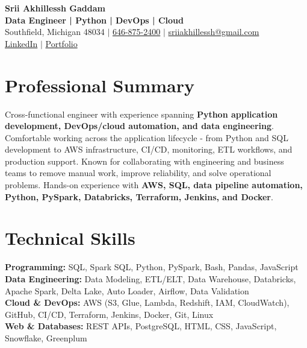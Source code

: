 \documentclass[letterpaper,10pt]{article}
\begin{document}
\fontsize{9.35pt}{10.45pt}\selectfont

\begin{center}
    {\LARGE \textbf{Srii Akhillessh Gaddam}} \\[-1pt]
    \textbf{Data Engineer | Python | DevOps | Cloud} \\[2pt]
    Southfield, Michigan 48034 $|$
    \href{tel:6468752400}{646-875-2400} $|$
    \href{mailto:sriiakhillessh@gmail.com}{sriiakhillessh@gmail.com} \\[1pt]
    \href{https://www.linkedin.com/in/srii-akhiilessh-gaddam-b48668191/}{LinkedIn} $|$
    \href{https://sriiakhillesshg.github.io/portfolio/}{Portfolio}
\end{center}
\vspace{-8pt}

\section{Professional Summary}
\small{Cross-functional engineer with experience spanning \textbf{Python application development, DevOps/cloud automation, and data engineering}. Comfortable working across the application lifecycle - from Python and SQL development to AWS infrastructure, CI/CD, monitoring, ETL workflows, and production support. Known for collaborating with engineering and business teams to remove manual work, improve reliability, and solve operational problems. Hands-on experience with \textbf{AWS, SQL, data pipeline automation, Python, PySpark, Databricks, Terraform, Jenkins, and Docker}.}

\section{Technical Skills}
\small{
\textbf{Programming:} SQL, Spark SQL, Python, PySpark, Bash, Pandas, JavaScript \\
\textbf{Data Engineering:} Data Modeling, ETL/ELT, Data Warehouse, Databricks, Apache Spark, Delta Lake, Auto Loader, Airflow, Data Validation \\
\textbf{Cloud \& DevOps:} AWS (S3, Glue, Lambda, Redshift, IAM, CloudWatch), GitHub, CI/CD, Terraform, Jenkins, Docker, Git, Linux \\
\textbf{Web \& Databases:} REST APIs, PostgreSQL, HTML, CSS, JavaScript, Snowflake, Greenplum
}
\end{document}
